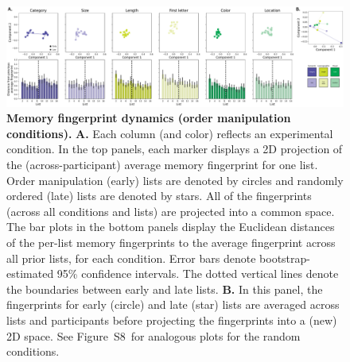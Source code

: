 \documentclass[11pt]{article}
\newcommand{\fingerprintTrajectoryRandom}{S8}
\begin{document}
\begin{figure}[tp] \centering
    \includegraphics[width=\textwidth]{figures/fingerprint_trajectories}

    \caption{\textbf{Memory fingerprint dynamics (order manipulation
    conditions).} \textbf{A.} Each column (and color) reflects an experimental
    condition. In the top panels, each marker displays a 2D projection of the
    (across-participant) average memory fingerprint for one list. Order
    manipulation (early) lists are denoted by circles and randomly ordered
    (late) lists are denoted by stars. All of the fingerprints (across all
    conditions and lists) are projected into a common space. The bar plots in
    the bottom panels display the Euclidean distances of the per-list memory
    fingerprints to the average fingerprint across all prior lists, for each
    condition. Error bars denote bootstrap-estimated 95\% confidence intervals.
    The dotted vertical lines denote the boundaries between early and late
    lists. \textbf{B.} In this panel, the fingerprints for early (circle) and
    late (star) lists are averaged across lists and participants before
    projecting the fingerprints into a (new) 2D space. See
    Figure~\fingerprintTrajectoryRandom~for analogous plots for the random
    conditions. } \label{fig:fingerprint-trajectories}

    \end{figure}
\end{document}
